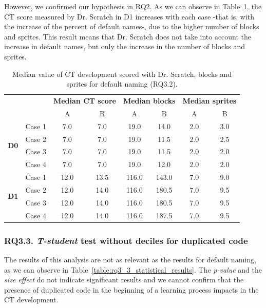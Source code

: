 However, we confirmed our hypothesis in RQ2. As we can observe in Table~\ref{table:rq3_2_statistical_results_median}, the CT score measured by Dr. Scratch in D1 increases with each case -that is, with the increase of the percent of default names-, due to the higher number of blocks and sprites. This result means that Dr. Scratch does not take into account the increase in default names, but only the increase in the number of blocks and sprites.


\begin{table}
 \begin{center}
  \begin{tabular}{|c|c|c|c|c|c|c|c|}
    \cline{3-8}
     \multicolumn{2}{c}{} & 
     \multicolumn{2}{|c|}{\textbf{Median CT score}} & \multicolumn{2}{|c|}{\textbf{Median blocks}} & \multicolumn{2}{|c|}{\textbf{Median sprites}} \\ \cline{3-8}
     \multicolumn{2}{c|}{} & 
     A & B & A & B & A & B \\ \hline
     \multirow{4}{*}{\textbf{D0}}
     & Case 1 & 7.0 & 7.0 & 19.0 & 14.0 & 2.0 & 3.0 \\
     & Case 2 & 7.0 & 7.0 & 19.0 & 11.5 & 2.0 & 2.5 \\
     & Case 3 & 7.0 & 7.0 & 19.0 & 11.5 & 2.0 & 2.0 \\
     & Case 4 & 7.0 & 7.0 & 19.0 & 12.0 & 2.0 & 2.0 \\ \hline
     \multirow{4}{*}{\textbf{D1}}
     & Case 1 & 12.0 & 13.5 & 116.0 & 143.0 & 7.0 & 9.0 \\
     & Case 2 & 12.0 & 14.0 & 116.0 & 180.5 & 7.0 & 9.5 \\
     & Case 3 & 12.0 & 14.0 & 116.0 & 180.5 & 7.0 & 9.5 \\
     & Case 4 & 12.0 & 14.0 & 116.0 & 187.5 & 7.0 & 9.5 \\ \hline
  \end{tabular}
  \caption{Median value of CT development scored with Dr. Scratch, blocks and sprites for default naming (RQ3.2).}
  \label{table:rq3_2_statistical_results_median}
 \end{center}
\end{table}


\subsubsection{RQ3.3. \textit{T-student} test without deciles for duplicated code}
\label{subsubsec:RQ3_3_statistical_results}

The results of this analysis are not as relevant as the results for default naming, as we can observe in Table~\ref{table:rq3_3_statistical_results}. The \textit{p-value} and the \textit{size effect} do not indicate significant results and we cannot confirm that the presence of duplicated code in the beginning of a learning process impacts in the CT development. 

